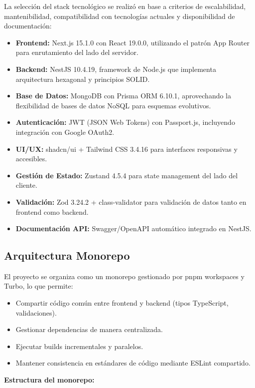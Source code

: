 La selección del stack tecnológico se realizó en base a criterios de escalabilidad, mantenibilidad, compatibilidad con tecnologías actuales y disponibilidad de documentación:

\begin{itemize}
    \item \textbf{Frontend:} Next.js 15.1.0 con React 19.0.0, utilizando el patrón App Router para enrutamiento del lado del servidor.
    \item \textbf{Backend:} NestJS 10.4.19, framework de Node.js que implementa arquitectura hexagonal y principios SOLID.
    \item \textbf{Base de Datos:} MongoDB con Prisma ORM 6.10.1, aprovechando la flexibilidad de bases de datos NoSQL para esquemas evolutivos.
    \item \textbf{Autenticación:} JWT (JSON Web Tokens) con Passport.js, incluyendo integración con Google OAuth2.
    \item \textbf{UI/UX:} shadcn/ui + Tailwind CSS 3.4.16 para interfaces responsivas y accesibles.
    \item \textbf{Gestión de Estado:} Zustand 4.5.4 para state management del lado del cliente.
    \item \textbf{Validación:} Zod 3.24.2 + class-validator para validación de datos tanto en frontend como backend.
    \item \textbf{Documentación API:} Swagger/OpenAPI automático integrado en NestJS.
\end{itemize}

\subsection{Arquitectura Monorepo}

El proyecto se organiza como un monorepo gestionado por pnpm workspaces y Turbo, lo que permite:

\begin{itemize}
    \item Compartir código común entre frontend y backend (tipos TypeScript, validaciones).
    \item Gestionar dependencias de manera centralizada.
    \item Ejecutar builds incrementales y paralelos.
    \item Mantener consistencia en estándares de código mediante ESLint compartido.
\end{itemize}

\textbf{Estructura del monorepo:}

